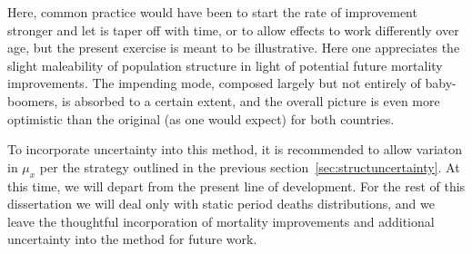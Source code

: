 Here, common practice would have been to start the rate of improvement stronger
and let is taper off with time, or to allow effects to work differently over
age, but the present exercise is meant to be illustrative. Here one appreciates
the slight maleability of population structure in light of potential future
mortality improvements. The impending mode, composed largely but not entirely of
baby-boomers, is absorbed to a certain extent, and the overall picture is even
more optimistic than the original (as one would expect) for both countries.

To incorporate uncertainty into this method, it is
recommended to allow variaton in $\mu_x$ per the strategy outlined in the previous
section~\ref{sec:structuncertainty}. At this time, we will depart from the
present line of development. For the rest of this dissertation we will deal only with static
period deaths distributions, and we leave the thoughtful incorporation of mortality 
improvements and additional uncertainty into the method for future work.

\FloatBarrier